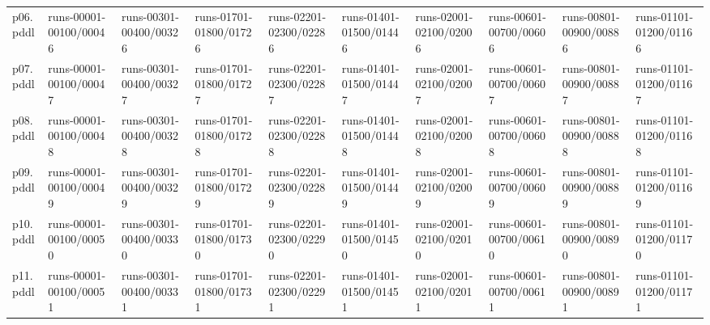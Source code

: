 \documentclass{article}
\begin{document}
\begin{tabular}{@{}lrrrrrrrrr@{}}
p06.pddl & \multicolumn{1}{|l|}{runs-00001-00100/00046} & \multicolumn{1}{|l|}{runs-00301-00400/00326} & \multicolumn{1}{|l|}{runs-01701-01800/01726} & \multicolumn{1}{|l|}{runs-02201-02300/02286} & \multicolumn{1}{|l|}{runs-01401-01500/01446} & \multicolumn{1}{|l|}{runs-02001-02100/02006} & \multicolumn{1}{|l|}{runs-00601-00700/00606} & \multicolumn{1}{|l|}{runs-00801-00900/00886} & \multicolumn{1}{|l|}{runs-01101-01200/01166} \\
p07.pddl & \multicolumn{1}{|l|}{runs-00001-00100/00047} & \multicolumn{1}{|l|}{runs-00301-00400/00327} & \multicolumn{1}{|l|}{runs-01701-01800/01727} & \multicolumn{1}{|l|}{runs-02201-02300/02287} & \multicolumn{1}{|l|}{runs-01401-01500/01447} & \multicolumn{1}{|l|}{runs-02001-02100/02007} & \multicolumn{1}{|l|}{runs-00601-00700/00607} & \multicolumn{1}{|l|}{runs-00801-00900/00887} & \multicolumn{1}{|l|}{runs-01101-01200/01167} \\
p08.pddl & \multicolumn{1}{|l|}{runs-00001-00100/00048} & \multicolumn{1}{|l|}{runs-00301-00400/00328} & \multicolumn{1}{|l|}{runs-01701-01800/01728} & \multicolumn{1}{|l|}{runs-02201-02300/02288} & \multicolumn{1}{|l|}{runs-01401-01500/01448} & \multicolumn{1}{|l|}{runs-02001-02100/02008} & \multicolumn{1}{|l|}{runs-00601-00700/00608} & \multicolumn{1}{|l|}{runs-00801-00900/00888} & \multicolumn{1}{|l|}{runs-01101-01200/01168} \\
p09.pddl & \multicolumn{1}{|l|}{runs-00001-00100/00049} & \multicolumn{1}{|l|}{runs-00301-00400/00329} & \multicolumn{1}{|l|}{runs-01701-01800/01729} & \multicolumn{1}{|l|}{runs-02201-02300/02289} & \multicolumn{1}{|l|}{runs-01401-01500/01449} & \multicolumn{1}{|l|}{runs-02001-02100/02009} & \multicolumn{1}{|l|}{runs-00601-00700/00609} & \multicolumn{1}{|l|}{runs-00801-00900/00889} & \multicolumn{1}{|l|}{runs-01101-01200/01169} \\
p10.pddl & \multicolumn{1}{|l|}{runs-00001-00100/00050} & \multicolumn{1}{|l|}{runs-00301-00400/00330} & \multicolumn{1}{|l|}{runs-01701-01800/01730} & \multicolumn{1}{|l|}{runs-02201-02300/02290} & \multicolumn{1}{|l|}{runs-01401-01500/01450} & \multicolumn{1}{|l|}{runs-02001-02100/02010} & \multicolumn{1}{|l|}{runs-00601-00700/00610} & \multicolumn{1}{|l|}{runs-00801-00900/00890} & \multicolumn{1}{|l|}{runs-01101-01200/01170} \\
p11.pddl & \multicolumn{1}{|l|}{runs-00001-00100/00051} & \multicolumn{1}{|l|}{runs-00301-00400/00331} & \multicolumn{1}{|l|}{runs-01701-01800/01731} & \multicolumn{1}{|l|}{runs-02201-02300/02291} & \multicolumn{1}{|l|}{runs-01401-01500/01451} & \multicolumn{1}{|l|}{runs-02001-02100/02011} & \multicolumn{1}{|l|}{runs-00601-00700/00611} & \multicolumn{1}{|l|}{runs-00801-00900/00891} & \multicolumn{1}{|l|}{runs-01101-01200/01171} \\

\end{tabular}
\end{document}

